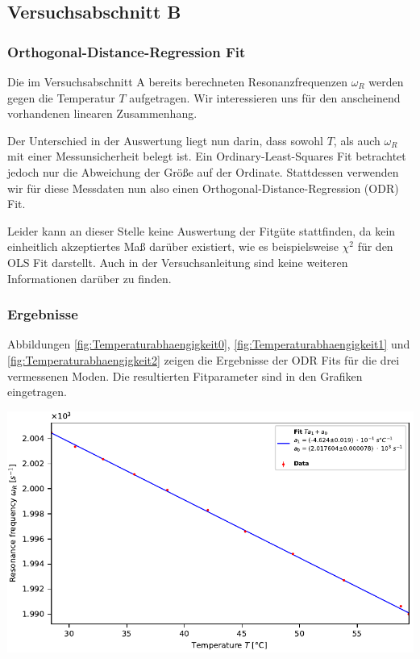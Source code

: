 \subsection{Versuchsabschnitt B}

\subsubsection*{Orthogonal-Distance-Regression Fit}

Die im Versuchsabschnitt A bereits berechneten Resonanzfrequenzen $\omega_R$ werden gegen die Temperatur $T$ aufgetragen.
Wir interessieren uns für den anscheinend vorhandenen linearen Zusammenhang.

Der Unterschied in der Auswertung liegt nun darin, dass sowohl $T$, als auch $\omega_R$ mit einer Messunsicherheit belegt ist.
Ein Ordinary-Least-Squares Fit betrachtet jedoch nur die Abweichung der Größe auf der Ordinate.
Stattdessen verwenden wir für diese Messdaten nun also einen Orthogonal-Distance-Regression (ODR) Fit.

Leider kann an dieser Stelle keine Auswertung der Fitgüte stattfinden, da kein einheitlich akzeptiertes Maß darüber existiert, wie es beispielsweise $\chi^2$ für den OLS Fit darstellt.
Auch in der Versuchsanleitung \cite{Anleitung} sind keine weiteren Informationen darüber zu finden.

\subsubsection*{Ergebnisse}

Abbildungen \ref{fig:Temperaturabhaengigkeit0}, \ref{fig:Temperaturabhaengigkeit1} und \ref{fig:Temperaturabhaengigkeit2} zeigen die Ergebnisse der ODR Fits für die drei vermessenen Moden.
Die resultierten Fitparameter sind in den Grafiken eingetragen.

\minipage{\linewidth}
    \begin{center}
        \captionsetup{type=figure}
        \begin{adjustbox}{max width=\linewidth, keepaspectratio}
            \includegraphics[]{pdf/T_0}
        \end{adjustbox}
        \label{fig:Temperaturabhaengigkeit0}
    \end{center}
\endminipage

